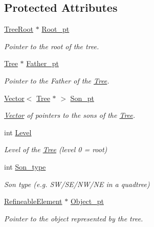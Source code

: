 \subsection*{Protected Attributes}
\begin{DoxyCompactItemize}
\item 
\hyperlink{classoomph_1_1TreeRoot}{Tree\+Root} $\ast$ \hyperlink{classoomph_1_1Tree_a61782afd668561ad7ab324f658ffeb6a}{Root\+\_\+pt}
\begin{DoxyCompactList}\small\item\em Pointer to the root of the tree. \end{DoxyCompactList}\item 
\hyperlink{classoomph_1_1Tree}{Tree} $\ast$ \hyperlink{classoomph_1_1Tree_a001ce5515a3d76cdad248695e149504b}{Father\+\_\+pt}
\begin{DoxyCompactList}\small\item\em Pointer to the Father of the \hyperlink{classoomph_1_1Tree}{Tree}. \end{DoxyCompactList}\item 
\hyperlink{classoomph_1_1Vector}{Vector}$<$ \hyperlink{classoomph_1_1Tree}{Tree} $\ast$ $>$ \hyperlink{classoomph_1_1Tree_ac6b9069f345b296654421604c5569af6}{Son\+\_\+pt}
\begin{DoxyCompactList}\small\item\em \hyperlink{classoomph_1_1Vector}{Vector} of pointers to the sons of the \hyperlink{classoomph_1_1Tree}{Tree}. \end{DoxyCompactList}\item 
int \hyperlink{classoomph_1_1Tree_a9ac30decb7a63027906880620f8b98ee}{Level}
\begin{DoxyCompactList}\small\item\em Level of the \hyperlink{classoomph_1_1Tree}{Tree} (level 0 = root) \end{DoxyCompactList}\item 
int \hyperlink{classoomph_1_1Tree_a83fe7895af25c9f60062c081fc51967c}{Son\+\_\+type}
\begin{DoxyCompactList}\small\item\em Son type (e.\+g. S\+W/\+S\+E/\+N\+W/\+NE in a quadtree) \end{DoxyCompactList}\item 
\hyperlink{classoomph_1_1RefineableElement}{Refineable\+Element} $\ast$ \hyperlink{classoomph_1_1Tree_a61ee20b575da510512d0e108cf7b06c6}{Object\+\_\+pt}
\begin{DoxyCompactList}\small\item\em Pointer to the object represented by the tree. \end{DoxyCompactList}\end{DoxyCompactItemize}
